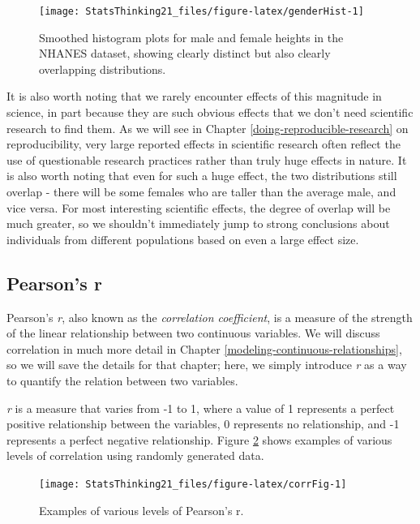 \documentclass[
  12pt,
]{book}
\begin{document}
\begin{figure}
\texttt{[image: StatsThinking21\_files/figure-latex/genderHist-1]} \caption{Smoothed histogram plots for male and female heights in the NHANES dataset, showing clearly distinct but also clearly overlapping distributions.}\label{fig:genderHist}
\end{figure}

It is also worth noting that we rarely encounter effects of this magnitude in science, in part because they are such obvious effects that we don't need scientific research to find them. As we will see in Chapter \ref{doing-reproducible-research} on reproducibility, very large reported effects in scientific research often reflect the use of questionable research practices rather than truly huge effects in nature. It is also worth noting that even for such a huge effect, the two distributions still overlap - there will be some females who are taller than the average male, and vice versa. For most interesting scientific effects, the degree of overlap will be much greater, so we shouldn't immediately jump to strong conclusions about individuals from different populations based on even a large effect size.

\hypertarget{pearsons-r}{%
\subsection{Pearson's r}\label{pearsons-r}}

Pearson's \emph{r}, also known as the \emph{correlation coefficient}, is a measure of the strength of the linear relationship between two continuous variables. We will discuss correlation in much more detail in Chapter \ref{modeling-continuous-relationships}, so we will save the details for that chapter; here, we simply introduce \emph{r} as a way to quantify the relation between two variables.

\emph{r} is a measure that varies from -1 to 1, where a value of 1 represents a perfect positive relationship between the variables, 0 represents no relationship, and -1 represents a perfect negative relationship. Figure \ref{fig:corrFig} shows examples of various levels of correlation using randomly generated data.

\begin{figure}
\texttt{[image: StatsThinking21\_files/figure-latex/corrFig-1]} \caption{Examples of various levels of Pearson's r.}\label{fig:corrFig}
\end{figure}
\end{document}
